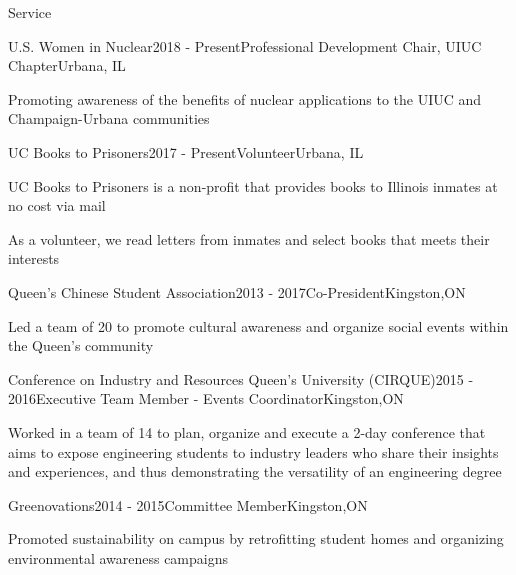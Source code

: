 \documentclass{resume2} %
\begin{document}
\begin{rSection}{Service}

	\begin{rSubsection}{U.S. Women in Nuclear}{2018 - Present}{Professional Development Chair, UIUC Chapter}{Urbana, IL}
		\item Promoting awareness of the benefits of nuclear applications to the UIUC and Champaign-Urbana communities
	\end{rSubsection}

	\begin{rSubsection}{UC Books to Prisoners}{2017 - Present}{Volunteer}{Urbana, IL}
		\item UC Books to Prisoners is a non-profit that provides books to Illinois inmates at no cost via mail
		\item As a volunteer, we read letters from inmates and select books that meets their interests
	\end{rSubsection}
	
	\begin{rSubsection}{Queen's Chinese Student Association}{2013 - 2017}{Co-President}{Kingston,ON}
		\item Led a team of 20 to promote cultural awareness and organize social events within the Queen's community
	\end{rSubsection}

	\begin{rSubsection}{Conference on Industry and Resources Queen's University (CIRQUE)}{2015 - 2016}{Executive Team Member - Events Coordinator}{Kingston,ON}
		\item Worked in a team of 14 to plan, organize and execute a 2-day conference that aims to expose engineering students to industry leaders who share their insights and experiences, and thus demonstrating the versatility of an engineering degree
	\end{rSubsection}	
\iffalse
	\begin{rSubsection}{Queen's Association for Technology in Medicine and Biology}{2015 - 2016}{Vice President of Publicity }{Kingston,ON}
		\item Collaborated with a small executive team to organize a lecture series where faculty and students present their work that pertains to the application of technology in medicine and biology
	\end{rSubsection}	
\fi
	\begin{rSubsection}{Greenovations}{2014 - 2015}{Committee Member}{Kingston,ON}
		\item Promoted sustainability on campus by retrofitting student homes and organizing environmental awareness campaigns 
	\end{rSubsection}	
	
\end{rSection}
\end{document}

